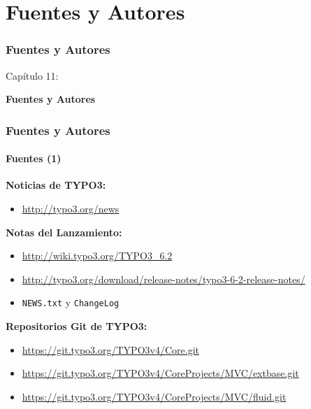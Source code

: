 %

\section{Fuentes y Autores}
\begin{frame}[fragile]
	\frametitle{Fuentes y Autores}

	\begin{center}\huge{Capítulo 11:}\end{center}
	\begin{center}\huge{\color{typo3darkgrey}\textbf{Fuentes y Autores}}\end{center}

\end{frame}


\begin{frame}[fragile]
	\frametitle{Fuentes y Autores}
	\framesubtitle{Fuentes (1)}

	\textbf{Noticias de TYPO3:}
		\begin{itemize}\smaller
			\item \url{http://typo3.org/news}
		\end{itemize}

	\textbf{Notas del Lanzamiento:}
		\begin{itemize}\smaller
			\item \url{http://wiki.typo3.org/TYPO3_6.2}
			\item \url{http://typo3.org/download/release-notes/typo3-6-2-release-notes/}
			\item \texttt{NEWS.txt} y \texttt{ChangeLog}
		\end{itemize}

	\textbf{Repositorios Git de TYPO3:}
		\begin{itemize}\smaller
			\item \url{https://git.typo3.org/TYPO3v4/Core.git}
			\item \url{https://git.typo3.org/TYPO3v4/CoreProjects/MVC/extbase.git}
			\item \url{https://git.typo3.org/TYPO3v4/CoreProjects/MVC/fluid.git}
		\end{itemize}

\end{frame}

